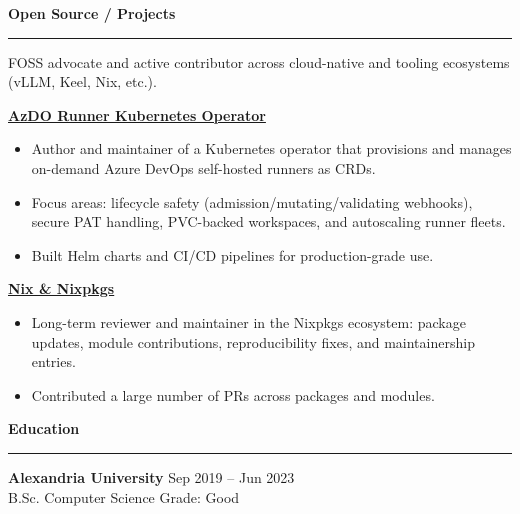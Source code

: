 \documentclass[11pt]{article}
\newcommand{\cvsection}[1]{%
  \vspace{6pt}%
  {\large\bfseries\textcolor{accent}{#1}}\\[-4pt]%
  \textcolor{accent}{\rule{\linewidth}{0.6pt}}%
  \vspace{6pt}%
}
\newcommand{\cventry}[5]{%
  {\textbf{#2}} \hfill {\small\textcolor{muted}{#1}}\\
  {\small\itshape #3} \hfill {\small\textcolor{muted}{#4}}\\[-6pt]
  #5
  \vspace{6pt}
}
\begin{document}

\cvsection{Open Source / Projects}

FOSS advocate and active contributor across cloud-native and tooling ecosystems (vLLM, Keel, Nix, etc.).

\textbf{\href{https://github.com/mahmoudk1000/azdo-runner-operator}{AzDO Runner Kubernetes Operator}}\\
\begin{itemize}
	\item Author and maintainer of a Kubernetes operator that provisions and manages on-demand Azure DevOps self-hosted runners as CRDs.
	\item Focus areas: lifecycle safety (admission/mutating/validating webhooks), secure PAT handling, PVC-backed workspaces, and autoscaling runner fleets.
	\item Built Helm charts and CI/CD pipelines for production-grade use.
\end{itemize}

\textbf{\href{https://nixos.org}{Nix \& Nixpkgs}}\\
\begin{itemize}
	\item Long-term reviewer and maintainer in the Nixpkgs ecosystem: package updates, module contributions, reproducibility fixes, and maintainership entries.
	\item Contributed a large number of PRs across packages and modules.
\end{itemize}


\cvsection{Education}

\textbf{Alexandria University} \hfill Sep 2019 -- Jun 2023\\
B.Sc. Computer Science \hfill Grade: Good
\end{document}
